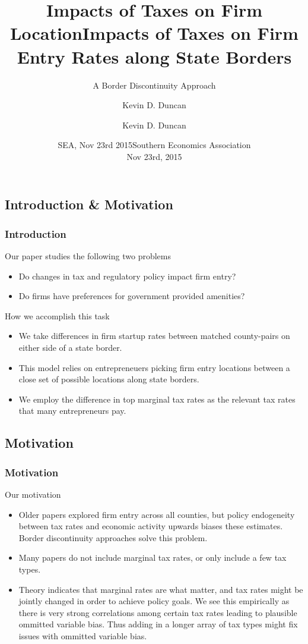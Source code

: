 \documentclass{beamer}
\title{Impacts of Taxes on Firm Location}
\author{Kevin D. Duncan}
\institute{Iowa State University}
\date{SEA, Nov 23rd 2015}
\begin{document}
\begin{frame}
\title{Impacts of Taxes on Firm Entry Rates along State Borders}
\subtitle{A Border Discontinuity Approach}
\author{Kevin D. Duncan}
\date{Southern Economics Association \\ Nov 23rd, 2015}
\maketitle
\end{frame}

\begin{frame}
\section{Introduction \& Motivation}
\frametitle{Introduction}
Our paper studies the following two problems
\begin{itemize}
\item Do changes in tax and regulatory policy impact firm entry?
\item Do firms have preferences for government provided amenities?
\end{itemize}

How we accomplish this task
\begin{itemize}
\item We take differences in firm startup rates between matched county-pairs on either side of a state border.
\item This model relies on entrepreneuers picking firm entry locations between a close set of possible locations along state borders.
\item We employ the difference in top marginal tax rates as the relevant tax rates that many entrepreneurs pay.
\end{itemize}

\end{frame}


\begin{frame}
\section{Motivation}
\frametitle{Motivation}
Our motivation
\begin{itemize}
\item Older papers explored firm entry across all counties, but policy endogeneity between tax rates and economic activity upwards biases these estimates. Border discontinuity approaches solve this problem.
\item  Many papers do not include marginal tax rates, or only include a few tax types.
\item Theory indicates that marginal rates are what matter, and tax rates might be jointly changed in order to achieve policy goals. We see this empirically as there is very strong correlations among certain tax rates leading to plausible ommitted variable bias. Thus adding in a longer array of tax types might fix issues with ommitted variable bias.
\end{itemize}
\end{frame}
\end{document}

